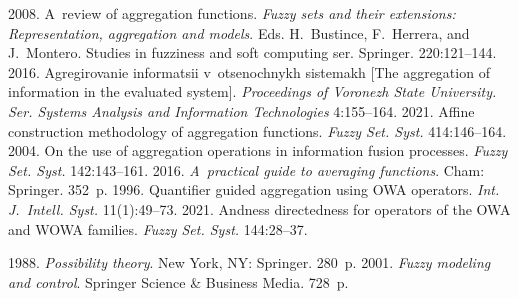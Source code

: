 


 


  \begin{multicols}{2}

\renewcommand{\bibname}{\protect\rmfamily References}

{\small\frenchspacing
 {%
 \begin{thebibliography}{99}
 2008. A~review of aggregation functions. 
 \textit{Fuzzy sets and their extensions: Representation, aggregation and models}. Eds. H.~Bustince, F.~Herrera, and J.~Montero. 
 Studies in fuzziness and soft computing ser. Springer. 220:121--144.
 2016. Agre\-gi\-ro\-va\-nie informatsii v~otsenochnykh sistemakh [The aggregation of information in the evaluated system]. 
 \textit{Proceedings of Voronezh State University. Ser. Systems Analysis and Information Technologies} 4:155--164.
 2021. Affine construction methodology of aggregation functions. \textit{Fuzzy Set. Syst.} 414:146--164.
 2004. On the use of aggregation operations in information fusion processes. 
\textit{Fuzzy Set. Syst.} 142:143--161.
 2016. \textit{A~practical guide to averaging functions}. Cham: Springer. 352~p. 
 1996. Quantifier guided aggregation using OWA operators. \textit{Int. J.~Intell. Syst.} 11(1):49--73.
 2021. Andness directedness for operators of the OWA and WOWA families. \textit{Fuzzy Set. Syst.} 144:28--37.

 1988. \textit{Possibility theory}. New York, NY: Springer. 280~p.
 2001. \textit{Fuzzy modeling and control}. Springer Science \& Business Media. 728~p.


\end{thebibliography}}}
\end{multicols}

